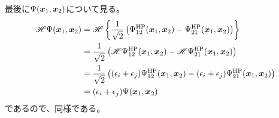 最後に$\Psi({\bm{x}}_1,{\bm{x}}_2)$について見る。
\begin{align}
	\H \Psi(\x_1,\x_2)
&=
	\H\left\{
		\frac{1}{\sqrt{2}}
			\left(
				\Psi^{\rm HP}_{12}(\x_1,\x_2)
				-
				\Psi^{\rm HP}_{21}(\x_1,\x_2)
			\right)
	\right\} \\
%
%
&=
	\frac{1}{\sqrt{2}}
		\left(
			\H \Psi^{\rm HP}_{12}(\x_1,\x_2)
			-
			\H \Psi^{\rm HP}_{21}(\x_1,\x_2)
		\right) \\
%
%
&=
	\frac{1}{\sqrt{2}}
		\left(
			(\epsilon_i+\epsilon_j) \Psi^{\rm HP}_{12}(\x_1,\x_2)
			-
			(\epsilon_i+\epsilon_j) \Psi^{\rm HP}_{21}(\x_1,\x_2)
		\right) \\
%
%
&=
	(\epsilon_i+\epsilon_j) \Psi(\x_1,\x_2)
\end{align}
であるので、同様である。


